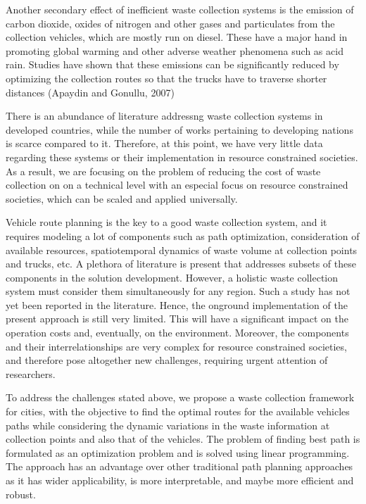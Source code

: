 \documentclass[12pt]{article}
\begin{document}
Another secondary effect of inefficient waste collection systems is the emission of carbon dioxide, oxides of nitrogen and other gases and particulates from the collection vehicles, which are mostly run on diesel. These have a major hand in promoting global warming and other adverse weather phenomena such as acid rain. Studies have shown that these emissions can be significantly reduced by optimizing the collection routes so that the trucks have to traverse shorter distances (Apaydin and Gonullu, 2007) 

There is an abundance of literature addressng waste collection systems in developed countries, while the number of works pertaining to developing nations is scarce compared to it. Therefore, at this point, we have very little data regarding these systems or their implementation in resource constrained societies. As a result, we are focusing on the problem of reducing the cost of waste collection on on a technical level with an especial focus on resource constrained societies, which can be scaled and applied universally.

Vehicle route planning is the key to a good waste collection system, and it requires modeling a lot of components such as path optimization, consideration of available resources, spatiotemporal dynamics of waste volume at collection points and trucks, etc. A plethora of literature is present that addresses subsets of these components in the solution development. However, a holistic waste collection system must consider them simultaneously for any region. Such a study has not yet been reported in the literature. Hence, the onground implementation of the present approach is still very limited. This will have a significant impact on the operation costs and, eventually, on the environment. Moreover, the components and their interrelationships are very complex for resource constrained societies, and therefore pose altogether new challenges, requiring urgent attention of researchers.

To address the challenges stated above, we propose a waste collection framework for cities, with the objective to find the optimal routes for the available vehicles paths while considering the dynamic variations in the waste information at collection points and also that of the vehicles. The problem of finding best path is formulated as an optimization problem and is solved using linear programming. The approach has an advantage over other traditional path planning approaches as it has wider applicability, is more interpretable, and maybe more efficient and robust.
\end{document}

